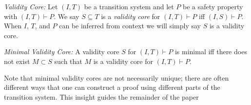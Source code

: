 \begin{definition}{\emph{Validity Core:}}
  \label{def:ivc}
  Let $(I, T)$ be a transition system and let $P$ be a
  safety property with $(I, T)\vdash P$. We say $S \subseteq
  T$ is a {\em validity core} for $(I, T)\vdash P$ iff $(I,
  S) \vdash P$. When $I$, $T$, and $P$ can be inferred from
  context we will simply say $S$ is a validity core.
\end{definition}

\begin{definition}{\emph{Minimal Validity Core:}}
  \label{def:minimal-ivc}
  A validity core $S$ for $(I, T)\vdash P$ is minimal iff
  there does not exist $M \subset S$ such that $M$ is a validity core
  for $(I, T)\vdash P$.
\end{definition}

Note that minimal validity cores are not necessarily unique; there are often different ways that one can construct a proof using different parts of the transition system.  This insight guides the remainder of the paper~

